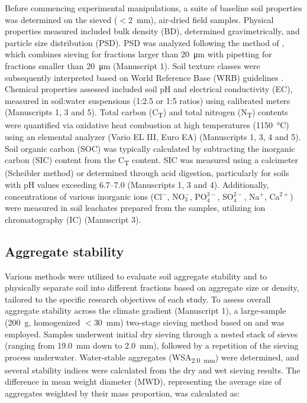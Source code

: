 Before commencing experimental manipulations, a suite of baseline soil properties was determined on the sieved ($<$\SI{2}{\milli\metre}), air-dried field samples. Physical properties measured included bulk density (BD), determined gravimetrically, and particle size distribution (PSD). PSD was analyzed following the method of \citet{Köhn1929}, which combines sieving for fractions larger than \SI{20}{\micro\metre} with pipetting for fractions smaller than \SI{20}{\micro\metre} (Manuscript 1). Soil texture classes were subsequently interpreted based on World Reference Base (WRB) guidelines \citep{Jahn2006}. Chemical properties assessed included soil pH and electrical conductivity (EC), measured in soil:water suspensions (1:2.5 or 1:5 ratios) using calibrated meters (Manuscripts 1, 3 and 5). Total carbon (C\textsubscript{T}) and total nitrogen (N\textsubscript{T}) contents were quantified via oxidative heat combustion at high temperatures (\SI{1150}{\degreeCelsius}) using an elemental analyzer (Vario EL III, Euro EA) (Manuscripts 1, 3, 4 and 5). Soil organic carbon (SOC) was typically calculated by subtracting the inorganic carbon (SIC) content from the C\textsubscript{T} content. SIC was measured using a calcimeter (Scheibler method) or determined through acid digestion, particularly for soils with pH values exceeding 6.7--7.0 (Manuscripts 1, 3 and 4). Additionally, concentrations of various inorganic ions (Cl$^{-}$, NO$_{3}^{-}$, PO$_{4}^{3-}$, SO$_{4}^{2-}$, Na$^{+}$, Ca$^{2+}$) were measured in soil leachates prepared from the samples, utilizing ion chromatography (IC) (Manuscript 3).

\subsection{Aggregate stability}

Various methods were utilized to evaluate soil aggregate stability and to physically separate soil into different fractions based on aggregate size or density, tailored to the specific research objectives of each study. To assess overall aggregate stability across the climate gradient (Manuscript 1), a large-sample (\SI{200}{\gram}, homogenized $<$\SI{30}{\milli\meter}) two-stage sieving method based on \citet{Hartge2009} and \citet{Six2000} was employed. Samples underwent initial dry sieving through a nested stack of sieves (ranging from \SI{19.0}{\milli\meter} down to \SI{2.0}{\milli\meter}), followed by a repetition of the sieving process underwater. Water-stable aggregates (WSA\textsubscript{\SI{2.0}{\milli\meter}}) were determined, and several stability indices were calculated from the dry and wet sieving results. The difference in mean weight diameter (MWD), representing the average size of aggregates weighted by their mass proportion, was calculated as:

